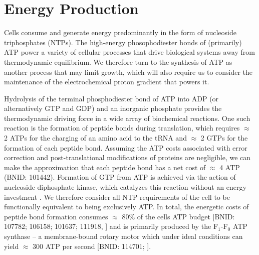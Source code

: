 \section{Energy Production}
Cells consume and generate energy predominantly in the form of nucleoside
triphosphates (NTPs). The high-energy phosophodiester bonds of
(primarily) ATP power a variety of cellular processes that drive biological
systems away from thermodynamic equilibrium. We therefore turn to the synthesis
of ATP as another process that may limit growth, which will also require us
to consider the maintenance of the electrochemical proton gradient that powers
it.

Hydrolysis of the terminal phosphodiester bond of ATP into ADP (or
alternatively GTP and GDP) and an inorganic phosphate provides the
thermodynamic driving force in a wide array of biochemical reactions. One
such reaction is the formation of peptide bonds during translation, which
requires $\approx$ 2 ATPs for the charging of an amino acid to the tRNA and
$\approx$ 2 GTPs for the formation of each peptide bond. Assuming the ATP
costs associated with error correction and post-translational modifications
of proteins are negligible, we can make the approximation that each peptide
bond has a net cost of $\approx$ 4 ATP (BNID: 101442).
Formation of GTP from ATP is achieved via the action of nucleoside
diphosphate kinase, which catalyzes this reaction without an energy
investment \citep{lascu2000}. We therefore consider all NTP requirements of
the cell to be functionally equivalent to being exclusively ATP. In total,
the energetic costs of peptide bond formation consumes $\approx$ 80\% of the
cells ATP budget [BNID: 107782; 106158; 101637; 111918,
\cite{lynch2015,stouthamer1973}] and is primarily produced by the
F$_1$-F$_0$ ATP synthase -- a membrane-bound rotary motor which under ideal
conditions can yield $\approx$ 300 ATP per second [BNID: 114701;
\cite{weber2003}].

